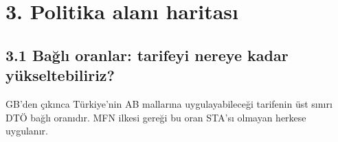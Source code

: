 \hypertarget{02a_politika_uzayi-3-politika-alanux131-haritasux131}{%
\section{3. Politika alanı haritası}\label{02a_politika_uzayi-3-politika-alanux131-haritasux131}}

\hypertarget{02a_politika_uzayi-31-baux11flux131-oranlar-tarifeyi-nereye-kadar-yuxfckseltebiliriz}{%
\subsection{3.1 Bağlı oranlar: tarifeyi nereye kadar yükseltebiliriz?}\label{02a_politika_uzayi-31-baux11flux131-oranlar-tarifeyi-nereye-kadar-yuxfckseltebiliriz}}

GB'den çıkınca Türkiye'nin AB mallarına uygulayabileceği tarifenin üst sınırı DTÖ bağlı oranıdır. MFN ilkesi gereği bu oran STA'sı olmayan herkese uygulanır.

\begingroup\gbtablo\footnotesize


